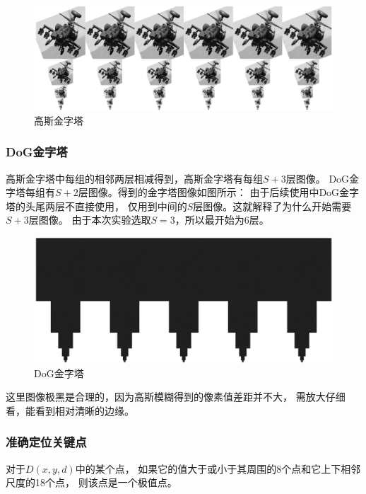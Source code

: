 \documentclass{article}
\begin{document}
\begin{figure}[h]
\centering
\includegraphics[width=1\textwidth]{./result/gauss_pyr}
\caption{高斯金字塔}
\end{figure}

\subsubsection{DoG金字塔}

    高斯金字塔中每组的相邻两层相减得到，高斯金字塔有每组\(S+3\)层图像。
    DoG金字塔每组有\(S+2\)层图像。得到的金字塔图像如图所示：
    由于后续使用中DoG金字塔的头尾两层不直接使用，
    仅用到中间的\(S\)层图像。这就解释了为什么开始需要\(S+3\)层图像。
    由于本次实验选取\(S = 3\)，所以最开始为6层。

\begin{figure}[h]
\centering
\includegraphics[width=1\textwidth]{./result/DoG_pyr}
\caption{DoG金字塔}
\end{figure}

    这里图像极黑是合理的，因为高斯模糊得到的像素值差距并不大，
    需放大仔细看，能看到相对清晰的边缘。

\subsubsection{准确定位关键点}

    对于\( D(x, y, d) \)中的某个点，
    如果它的值大于或小于其周围的8个点和它上下相邻尺度的18个点，
    则该点是一个极值点。
\end{document}
